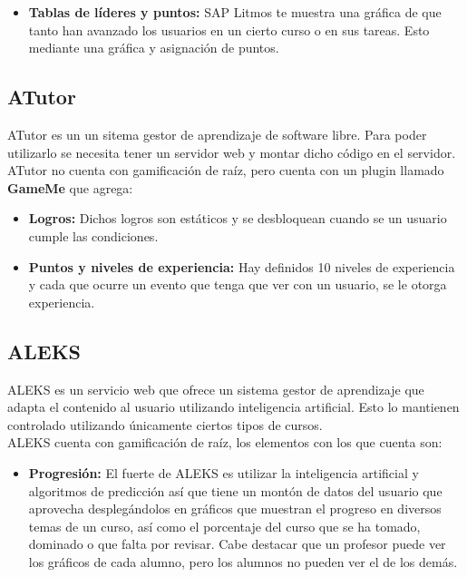 \begin{multicols*}{2}
\begin{itemize}
        \item {\bf Tablas de líderes y puntos: } SAP Litmos te muestra una
         gráfica de que tanto han avanzado los usuarios en un cierto curso
         o en sus tareas. Esto mediante una gráfica y asignación de puntos.
         
    \end{itemize}


\subsection*{ATutor}

 ATutor \cite{PagATutor} es un un sitema gestor de aprendizaje de software libre. Para poder
 utilizarlo se necesita tener un servidor web y montar dicho código en el servidor.\\
    
    \noindent ATutor no cuenta con gamificación de raíz,
    pero cuenta con un plugin llamado \textbf{GameMe} que agrega:
    
    \begin{itemize}
        \item {\bf Logros:} Dichos logros son estáticos y se
        desbloquean cuando se un usuario cumple las condiciones.
        
        \item {\bf Puntos y niveles de experiencia:} Hay definidos 10
        niveles de experiencia y cada que ocurre un evento que tenga
        que ver con un usuario, se le otorga experiencia.
        
    \end{itemize}



\subsection*{ALEKS}

 ALEKS \cite{PagALEKS} es un servicio web que ofrece un sistema gestor de aprendizaje
 que adapta el contenido al usuario utilizando inteligencia artificial.
 Esto lo mantienen controlado utilizando únicamente ciertos tipos de cursos.\\
    
    \noindent ALEKS cuenta con gamificación de raíz, los elementos con los que cuenta son:
    
    \begin{itemize}
        \item {\bf Progresión:} El fuerte de ALEKS es utilizar la inteligencia
        artificial y algoritmos de predicción así que tiene un montón de datos del
        usuario que aprovecha desplegándolos en gráficos que muestran el progreso
        en diversos temas de un curso, así como el porcentaje del curso que se ha
        tomado, dominado o que falta por revisar. Cabe destacar que un profesor puede
        ver los gráficos de cada alumno, pero los alumnos no pueden ver el de los demás.
        

\end{itemize}
\end{multicols*}
